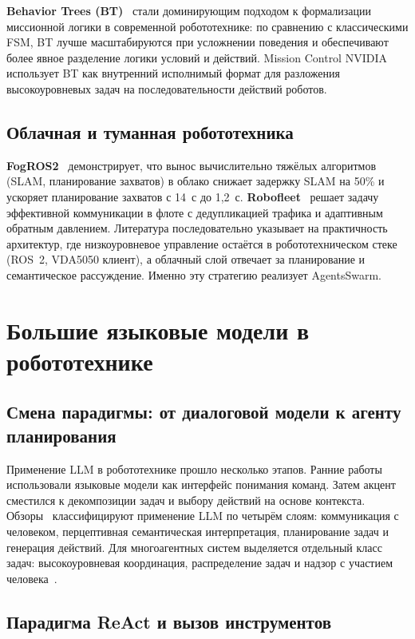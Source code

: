\documentclass[14pt,a4paper]{extreport}
\begin{document}
\textbf{Behavior Trees (BT)}~\cite{iovino2022bt} стали доминирующим подходом к формализации миссионной логики в современной робототехнике: по сравнению с классическими FSM, BT лучше масштабируются при усложнении поведения и обеспечивают более явное разделение логики условий и действий. Mission Control NVIDIA использует BT как внутренний исполнимый формат для разложения высокоуровневых задач на последовательности действий роботов.

\subsection{Облачная и туманная робототехника}

\textbf{FogROS2}~\cite{chen2023fogros2} демонстрирует, что вынос вычислительно тяжёлых алгоритмов (SLAM, планирование захватов) в облако снижает задержку SLAM на 50\% и ускоряет планирование захватов с 14~с до 1{,}2~с. \textbf{Robofleet}~\cite{sikand2021robofleet} решает задачу эффективной коммуникации в флоте с дедупликацией трафика и адаптивным обратным давлением. Литература последовательно указывает на практичность архитектур, где низкоуровневое управление остаётся в робототехническом стеке (ROS~2, VDA5050 клиент), а облачный слой отвечает за планирование и семантическое рассуждение. Именно эту стратегию реализует AgentsSwarm.

\section{Большие языковые модели в робототехнике}

\subsection{Смена парадигмы: от диалоговой модели к агенту планирования}

Применение LLM в робототехнике прошло несколько этапов. Ранние работы использовали языковые модели как интерфейс понимания команд. Затем акцент сместился к декомпозиции задач и выбору действий на основе контекста. Обзоры~\cite{zeng2023llmrobotics,li2025llmmulti} классифицируют применение LLM по четырём слоям: коммуникация с человеком, перцептивная семантическая интерпретация, планирование задач и генерация действий. Для многоагентных систем выделяется отдельный класс задач: высокоуровневая координация, распределение задач и надзор с участием человека~\cite{li2025llmmulti}.

\subsection{Парадигма ReAct и вызов инструментов}
\end{document}
